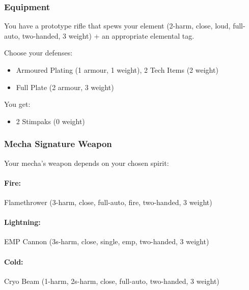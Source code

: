 

\subsubsection{Equipment}
You have a prototype rifle that spews your element (2-harm, close, loud, full-auto, two-handed, 3 weight) + an appropriate elemental tag.

Choose your defenses:
\begin{itemize}
\item Armoured Plating (1 armour, 1 weight), 2 Tech Items (2 weight)
\item Full Plate (2 armour, 3 weight)
\end{itemize}

You get:
\begin{itemize}
\item 2 Stimpaks (0 weight)
\end{itemize}

\subsubsection{Mecha Signature Weapon}
Your mecha's weapon depends on your chosen spirit:
\paragraph{Fire:} Flamethrower (3-harm, close, full-auto, fire, two-handed, 3 weight)
\paragraph{Lightning:} EMP Cannon (3s-harm, close, single, emp, two-handed, 3 weight)
\paragraph{Cold:} Cryo Beam (1-harm, 2s-harm, close, full-auto, two-handed, 3 weight)
